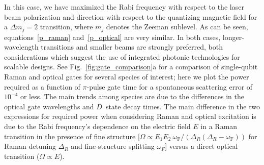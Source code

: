 \documentclass[%
reprint,
 amsmath,amssymb,
]{revtex4-1}
\begin{document}
\noindent In this case, we have maximized the Rabi frequency with respect to the laser beam polarization and direction with respect to the quantizing magnetic field for a $\Delta m_{j} = 2$ transition, where $m_{j}$ denotes the Zeeman sublevel.  As can be seen, equations~\ref{p_raman} and~\ref{p_optical} are very similar.  In both cases, longer-wavelength transitions and smaller beams are strongly preferred, both considerations which suggest the use of integrated photonic technologies for scalable designs.  See Fig.~\ref{fig:gate_comparison}a for a comparison of single-qubit Raman and optical gates for several species of interest; here we plot the power required as a function of $\pi$-pulse gate time for a spontaneous scattering error of $10^{-4}$ or less. The main trends among species are due to the differences in the optical gate wavelengths and $D$~state decay times.  The main difference in the two expressions for required power when considering Raman and optical excitation is due to the Rabi frequency's dependence on the electric field $E$ in a Raman transition in the presence of fine structure [$\Omega \propto E_1 E_2\ \omega_{\textrm{F}} / (\Delta_R(\Delta_R-\omega_{\textrm{F}}))$ for Raman detuning $\Delta_R$ and fine-structure splitting $\omega_{F}$] versus a direct optical transition ($\Omega \propto E$).
\end{document}
